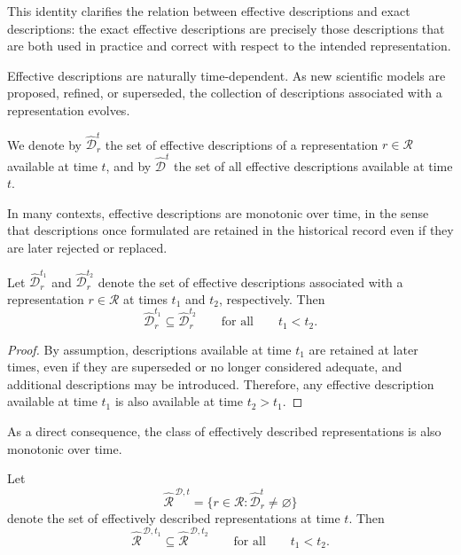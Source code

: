 This identity clarifies the relation between effective descriptions and exact descriptions: the exact
effective descriptions are precisely those descriptions that are both used in practice and correct with
respect to the intended representation.

Effective descriptions are naturally time-dependent. As new scientific models are proposed,
refined, or superseded, the collection of descriptions associated with a representation evolves.

\begin{notation}
We denote by \(\hat{\mathcal{D}}_r^t\) the set of effective descriptions of a representation \(r \in \mathcal{R}\)
available at time \(t\), and by \(\hat{\mathcal{D}}^t\) the set of all effective descriptions available at time \(t\).
\end{notation}

In many contexts, effective descriptions are monotonic over time, in the sense that descriptions
once formulated are retained in the historical record even if they are later rejected or replaced.

\begin{proposition}
\label{prop:effective_descriptions_monotonic}
Let \(\hat{\mathcal{D}}_r^{t_1}\) and \(\hat{\mathcal{D}}_r^{t_2}\) denote the set of effective descriptions
associated with a representation \(r \in \mathcal{R}\) at times \(t_1\) and \(t_2\), respectively. Then
\[
\hat{\mathcal{D}}_r^{t_1} \subseteq \hat{\mathcal{D}}_r^{t_2}
\qquad \text{for all} \qquad t_1 < t_2.
\]
\end{proposition}

\begin{proof}
By assumption, descriptions available at time \(t_1\) are retained at later times, even if they are
superseded or no longer considered adequate, and additional descriptions may be introduced.
Therefore, any effective description available at time \(t_1\) is also available at time \(t_2 > t_1\).
\end{proof}

As a direct consequence, the class of effectively described representations is also monotonic over
time.

\begin{proposition}
Let
\[
\hat{\mathcal{R}}^{\,\mathcal{D},t}
=
\{r \in \mathcal{R} : \hat{\mathcal{D}}_r^t \neq \varnothing\}
\]
denote the set of effectively described representations at time \(t\). Then
\[
\hat{\mathcal{R}}^{\,\mathcal{D},t_1}
\subseteq
\hat{\mathcal{R}}^{\,\mathcal{D},t_2}
\qquad \text{for all} \qquad t_1 < t_2.
\]
\end{proposition}

